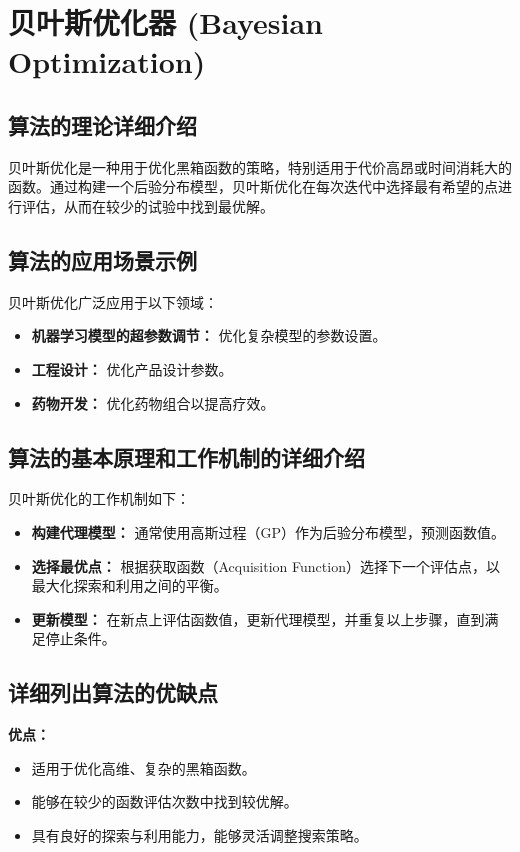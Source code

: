 \section{贝叶斯优化器 (Bayesian Optimization)}
\subsection*{算法的理论详细介绍}
贝叶斯优化是一种用于优化黑箱函数的策略，特别适用于代价高昂或时间消耗大的函数。通过构建一个后验分布模型，贝叶斯优化在每次迭代中选择最有希望的点进行评估，从而在较少的试验中找到最优解。

\subsection*{算法的应用场景示例}
贝叶斯优化广泛应用于以下领域：
\begin{itemize}
    \item \textbf{机器学习模型的超参数调节：} 优化复杂模型的参数设置。
    \item \textbf{工程设计：} 优化产品设计参数。
    \item \textbf{药物开发：} 优化药物组合以提高疗效。
\end{itemize}

\subsection*{算法的基本原理和工作机制的详细介绍}
贝叶斯优化的工作机制如下：
\begin{itemize}
    \item \textbf{构建代理模型：} 通常使用高斯过程（GP）作为后验分布模型，预测函数值。
    \item \textbf{选择最优点：} 根据获取函数（Acquisition Function）选择下一个评估点，以最大化探索和利用之间的平衡。
    \item \textbf{更新模型：} 在新点上评估函数值，更新代理模型，并重复以上步骤，直到满足停止条件。
\end{itemize}

\subsection*{详细列出算法的优缺点}
\textbf{优点：}
\begin{itemize}
    \item 适用于优化高维、复杂的黑箱函数。
    \item 能够在较少的函数评估次数中找到较优解。
    \item 具有良好的探索与利用能力，能够灵活调整搜索策略。
\end{itemize}

